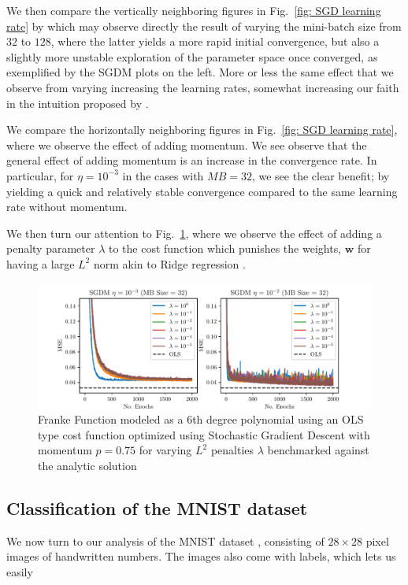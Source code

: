 \documentclass[reprint, english, nofootinbib]{revtex4-2}
\begin{document}
We then compare the vertically neighboring figures in Fig.~\ref{fig: SGD learning rate} by which may observe directly the result of varying the mini-batch size from $32$ to $128$, where the latter yields a more rapid initial convergence, but also a slightly more unstable exploration of the parameter space once converged, as exemplified by the SGDM plots on the left. More or less the same effect that we observe from varying increasing the learning rates, somewhat increasing our faith in the intuition proposed by \textcite{ManyBodyML}.

We compare the horizontally neighboring figures in Fig.~\ref{fig: SGD learning rate}, where we observe the effect of adding momentum. We see observe that the general effect of adding momentum is an increase in the convergence rate. In particular, for $\eta = 10^{-3}$ in the cases with $MB = 32$, we see the clear benefit; by yielding a quick and relatively stable convergence compared to the same learning rate without momentum.

We then turn our attention to Fig.~\ref{fig: SGD penalty}, where we observe the effect of adding a penalty parameter $\lambda$ to the cost function which punishes the weights, $\pmb w$ for having a large $L^2$ norm akin to Ridge regression \cite{4155_project_1}.
\begin{figure}
    \includegraphics[width=\columnwidth]{SGD_learning_penalty.pdf}
    \caption{\label{fig: SGD penalty}Franke Function modeled as a 6th degree polynomial using an OLS type cost function optimized using Stochastic Gradient Descent with momentum $p=0.75$ for varying $L^2$ penalties $\lambda$ benchmarked against the analytic solution}
\end{figure}


\subsection{Classification of the MNIST dataset}
\noindent
We now turn to our analysis of the MNIST dataset \cite{lecun2010mnist}, consisting of $28\times28$ pixel images of handwritten numbers. The images also come with labels, which lets us easily
\end{document}
